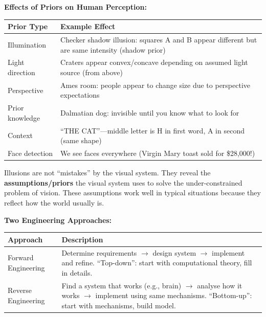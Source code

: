 \separator

\textbf{Effects of Priors on Human Perception:}

\begin{center}
\renewcommand{\arraystretch}{1.3}
\begin{tabular}{@{} l p{9cm} @{}}
\toprule
\textbf{Prior Type} & \textbf{Example Effect} \\
\midrule
Illumination & Checker shadow illusion: squares A and B appear different but are same intensity (shadow prior) \\
Light direction & Craters appear convex/concave depending on assumed light source (from above) \\
Perspective & Ames room: people appear to change size due to perspective expectations \\
Prior knowledge & Dalmatian dog: invisible until you know what to look for \\
Context & ``THE CAT''---middle letter is H in first word, A in second (same shape) \\
Face detection & We see faces everywhere (Virgin Mary toast sold for \$28,000!) \\
\bottomrule
\end{tabular}
\end{center}

\begin{thmbox}
Illusions are not ``mistakes'' by the visual system. They reveal the \textbf{assumptions/priors} the visual system uses to solve the under-constrained problem of vision. These assumptions work well in typical situations because they reflect how the world usually is.
\end{thmbox}

\separator

\textbf{Two Engineering Approaches:}

\begin{center}
\renewcommand{\arraystretch}{1.3}
\begin{tabular}{@{} l p{10cm} @{}}
\toprule
\textbf{Approach} & \textbf{Description} \\
\midrule
Forward Engineering & Determine requirements $\rightarrow$ design system $\rightarrow$ implement and refine. ``Top-down'': start with computational theory, fill in details. \\
Reverse Engineering & Find a system that works (e.g., brain) $\rightarrow$ analyse how it works $\rightarrow$ implement using same mechanisms. ``Bottom-up'': start with mechanisms, build model. \\
\bottomrule
\end{tabular}
\end{center}

